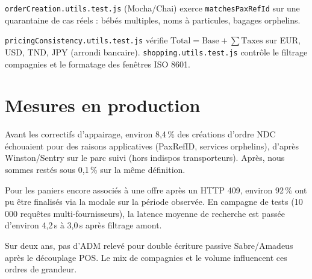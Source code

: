 \texttt{orderCreation.utils.test.js} (Mocha/Chai) exerce \texttt{matchesPaxRefId} sur une quarantaine de cas réels : bébés multiples, noms à particules, bagages orphelins.

\texttt{pricingConsistency.utils.test.js} vérifie $\text{Total} = \text{Base} + \sum \text{Taxes}$ sur EUR, USD, TND, JPY (arrondi bancaire). \texttt{shopping.utils.test.js} contrôle le filtrage compagnies et le formatage des fenêtres ISO 8601.

\section{Mesures en production}

Avant les correctifs d'appairage, environ 8,4\,\% des créations d'ordre NDC échouaient pour des raisons applicatives (PaxRefID, services orphelins), d'après Winston/Sentry sur le parc suivi (hors indispos transporteurs). Après, nous sommes restés sous 0,1\,\% sur la même définition.

Pour les paniers encore associés à une offre après un HTTP 409, environ 92\,\% ont pu être finalisés via la modale sur la période observée. En campagne de tests (10\,000 requêtes multi-fournisseurs), la latence moyenne de recherche est passée d'environ 4,2\,s à 3,0\,s après filtrage amont.

Sur deux ans, pas d'ADM relevé pour double écriture passive Sabre/Amadeus après le découplage POS. Le mix de compagnies et le volume influencent ces ordres de grandeur.

